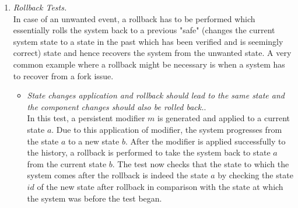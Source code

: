 \begin{enumerate}[\IEEEsetlabelwidth{Z}]
\item \textit{Rollback Tests.}\\
In case of an unwanted event, a rollback has to be performed which essentially rolls the system back to a previous "safe" (changes the current system state to a state in the past which has been verified and is seemingly correct) state and hence recovers the system from the unwanted state. A very common example where a rollback might be necessary is when a system has to recover from a fork issue.
\begin{itemize}[]
\item \textit{State changes application and rollback should lead to the same state and the component changes should also be rolled back.}.\\
In this test, a persistent modifier $m$ is generated and applied to a current state $a$. Due to this application of modifier, the system progresses from the state $a$ to a new state $b$. After the modifier is applied successfully to the history, a rollback is performed to take the system back to state $a$ from the current state $b$. The test now checks that the state to which the system comes after the rollback is indeed the state $a$ by checking the state $id$ of the new state after rollback in comparison with the state at which the system was before the test began.\\

\end{itemize}
\end{enumerate}
